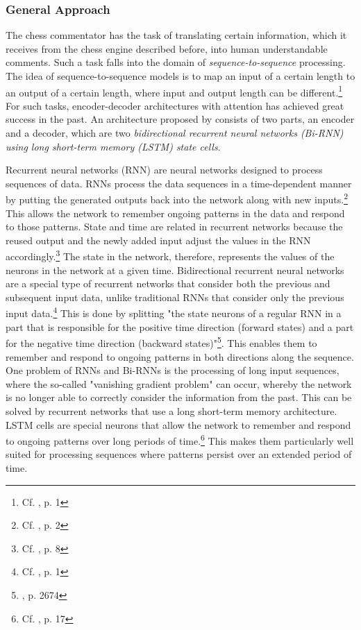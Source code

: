 \subsubsection{General Approach}

The chess commentator has the task of translating certain information, which it receives from the chess engine described before, into human understandable comments. Such a task falls into the domain of \textit{sequence-to-sequence} processing. The idea of sequence-to-sequence models is to map an input of a certain length to an output of a certain length, where input and output length can be different.\footnote{Cf. \cite{Sutskever-2014-sts}, p. 1} For such tasks, encoder-decoder architectures with attention has achieved great success in the past. An architecture proposed by \cite{zang-etal-2019-automated} consists of two parts, an encoder and a decoder, which are two \textit{bidirectional recurrent neural networks (Bi-RNN) using long short-term memory (LSTM) state cells}.

Recurrent neural networks (RNN) are neural networks designed to process sequences of data. RNNs process the data sequences in a time-dependent manner by putting the generated outputs back into the network along with new inputs.\footnote{Cf. \cite{rnn-2015-review}, p. 2} This allows the network to remember ongoing patterns in the data and respond to those patterns. State and time are related in recurrent networks because the reused output and the newly added input adjust the values in the RNN accordingly.\footnote{Cf. \cite{rnn-2015-review}, p. 8} The state in the network, therefore, represents the values of the neurons in the network at a given time. Bidirectional recurrent neural networks are a special type of recurrent networks that consider both the previous and subsequent input data, unlike traditional RNNs that consider only the previous input data.\footnote{Cf. \cite{https://doi.org/10.48550/arxiv.1801.01078}, p. 1} This is done by splitting "the state neurons of a regular RNN in a part that is responsible for the positive time direction (forward states) and a part for the negative time direction (backward states)"\footnote{\cite{Schuster1997BidirectionalRN}, p. 2674}. This enables them to remember and respond to ongoing patterns in both directions along the sequence. One problem of RNNs and Bi-RNNs is the processing of long input sequences, where the so-called "vanishing gradient problem" can occur, whereby the network is no longer able to correctly consider the information from the past. This can be solved by recurrent networks that use a long short-term memory architecture. LSTM cells are special neurons that allow the network to remember and respond to ongoing patterns over long periods of time.\footnote{Cf. \cite{rnn-2015-review}, p. 17} This makes them particularly well suited for processing sequences where patterns persist over an extended period of time.

